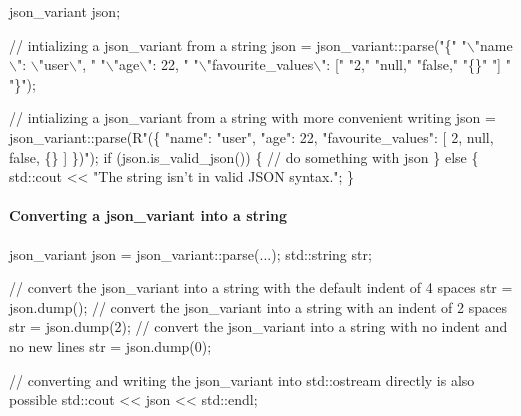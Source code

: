 \begin{DoxyCode}
json\_variant json;

\textcolor{comment}{// intializing a json\_variant from a string}
json = json\_variant::parse(\textcolor{stringliteral}{"\{"} 
    \textcolor{stringliteral}{"\(\backslash\)"name\(\backslash\)": \(\backslash\)"user\(\backslash\)", "}
    \textcolor{stringliteral}{"\(\backslash\)"age\(\backslash\)": 22, "}
    \textcolor{stringliteral}{"\(\backslash\)"favourite\_values\(\backslash\)": ["}
        \textcolor{stringliteral}{"2,"}
        \textcolor{stringliteral}{"null,"}
        \textcolor{stringliteral}{"false,"}
        \textcolor{stringliteral}{"\{\}"}
    \textcolor{stringliteral}{"] "}
\textcolor{stringliteral}{"\}"});

\textcolor{comment}{// intializing a json\_variant from a string with more convenient writing}
json = json\_variant::parse(R\textcolor{stringliteral}{"(\{}
\textcolor{stringliteral}{    "name": "user",}
\textcolor{stringliteral}{    "age": 22,}
\textcolor{stringliteral}{    "favourite\_values": [}
\textcolor{stringliteral}{        2,}
\textcolor{stringliteral}{        null,}
\textcolor{stringliteral}{        false,}
\textcolor{stringliteral}{        \{\}}
\textcolor{stringliteral}{    ]}
\textcolor{stringliteral}{\})");}
\textcolor{stringliteral}{}
\textcolor{stringliteral}{}\textcolor{keywordflow}{if} (json.is\_valid\_json()) \{
    \textcolor{comment}{// do something with json}
\}
\textcolor{keywordflow}{else} \{        
    std::cout << \textcolor{stringliteral}{"The string isn't in valid JSON syntax."};
\}
\end{DoxyCode}


\paragraph*{\label{_convert_a_json_to_string_section}%
Converting a json\+\_\+variant into a string}


\begin{DoxyCode}
json\_variant json = json\_variant::parse(...);
std::string str;

\textcolor{comment}{// convert the json\_variant into a string with the default indent of 4 spaces}
str = json.dump();
\textcolor{comment}{// convert the json\_variant into a string with an indent of 2 spaces}
str = json.dump(2);
\textcolor{comment}{// convert the json\_variant into a string with no indent and no new lines}
str = json.dump(0);

\textcolor{comment}{// converting and writing the json\_variant into std::ostream directly is also possible}
std::cout << json << std::endl;
\end{DoxyCode}


